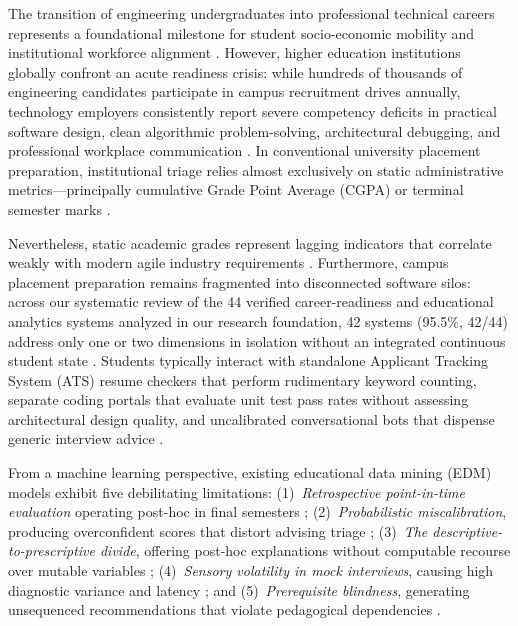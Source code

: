 \documentclass[conference]{IEEEtran}
\begin{document}
The transition of engineering undergraduates into professional technical careers represents a foundational milestone for student socio-economic mobility and institutional workforce alignment \cite{b1}. However, higher education institutions globally confront an acute readiness crisis: while hundreds of thousands of engineering candidates participate in campus recruitment drives annually, technology employers consistently report severe competency deficits in practical software design, clean algorithmic problem-solving, architectural debugging, and professional workplace communication \cite{b2}. In conventional university placement preparation, institutional triage relies almost exclusively on static administrative metrics---principally cumulative Grade Point Average (CGPA) or terminal semester marks \cite{b3}.

Nevertheless, static academic grades represent lagging indicators that correlate weakly with modern agile industry requirements \cite{b4}. Furthermore, campus placement preparation remains fragmented into disconnected software silos: across our systematic review of the 44 verified career-readiness and educational analytics systems analyzed in our research foundation, 42 systems (95.5\%, 42/44) address only one or two dimensions in isolation without an integrated continuous student state \cite{b6}. Students typically interact with standalone Applicant Tracking System (ATS) resume checkers that perform rudimentary keyword counting, separate coding portals that evaluate unit test pass rates without assessing architectural design quality, and uncalibrated conversational bots that dispense generic interview advice \cite{b3,b5}.

From a machine learning perspective, existing educational data mining (EDM) models exhibit five debilitating limitations: (1)~\textit{Retrospective point-in-time evaluation} operating post-hoc in final semesters \cite{b6,b7}; (2)~\textit{Probabilistic miscalibration}, producing overconfident scores that distort advising triage \cite{b8}; (3)~\textit{The descriptive-to-prescriptive divide}, offering post-hoc explanations without computable recourse over mutable variables \cite{b16,b17}; (4)~\textit{Sensory volatility in mock interviews}, causing high diagnostic variance and latency \cite{b12,b13,b19}; and (5)~\textit{Prerequisite blindness}, generating unsequenced recommendations that violate pedagogical dependencies \cite{b14,b20}.
\end{document}
